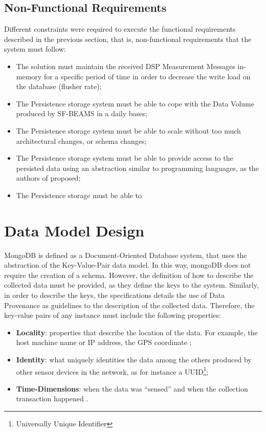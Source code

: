 \subsection{Non-Functional Requirements}

Different constraints were required to execute the functional requirements
described in the previous section, that is, non-functional requirements that
the system must follow:

\begin{itemize}
  \item The solution must maintain the received DSP Measurement Messages
  in-memory for a specific period of time in order to decrease the write load
  on the database (flusher rate);
  \item The Persistence storage system must be able to cope with the Data
  Volume produced by SF-BEAMS in a daily bases;
  \item The Persistence storage system must be able to scale without too much
  architectural changes, or schema changes;
  \item The Persistence storage system must be able to provide access to the
  persisted data using an abstraction similar to programming languages, as
  the authors of \cite{sn-programming-language} proposed;
  \item The Persistence storage must be able to 
\end{itemize}

\section{Data Model Design}
\label{sec:dsp-persistence-data-model}

MongoDB is defined as a Document-Oriented Database system, that uses the
abstraction of the Key-Value-Pair data model. In this way, mongoDB does not
require the creation of a schema. However, the definition of how to describe
the collected data must be provided, as they define the keys to the system.
Similarly, in order to describe the keys, the specifications details the use of
Data Provenance as guidelines to the description of the collected data.
Therefore, the key-value pairs of any instance must include the following
properties:

\begin{itemize}
  \item \textbf{Locality}: properties that describe the location of the data.
  For example, the host machine name or IP address, the GPS coordinate
  \cite{gps};
  \item \textbf{Identity}: what uniquely identities the data among the others
  produced by other sensor devices in the network, as for instance a
  UUID\footnote{Universally Unique Identifier};
  \item \textbf{Time-Dimensions}: when the data was ``sensed''
  \cite{db-provenance} and when the collection transaction happened
  \cite{sn-time-series}.
\end{itemize}

